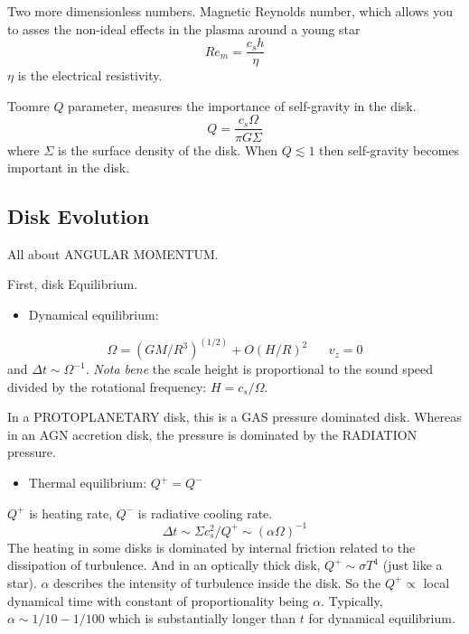 \documentclass[11pt,a4paper]{article}
\begin{document}
Two more dimensionless numbers.  Magnetic Reynolds number, which
allows you to asses the non-ideal effects in the plasma around a
young star 
\begin{equation} 
  Re_{m} = \frac{ c_{s} h} {\eta}
\end{equation} $\eta$ is the electrical resistivity.

Toomre $Q$ parameter, measures the importance of self-gravity in the
disk.
\begin{equation} 
  Q = \frac{ c_{s} \Omega } {\pi G \Sigma}
\end{equation} where $\Sigma$ is the surface density of the disk.
When $Q\lesssim1$ then self-gravity becomes important in the disk.


\subsection{Disk Evolution}
All about ANGULAR MOMENTUM. 

First, disk Equilibrium.  
\begin{itemize}
  \item Dynamical equilibrium: 
\end{itemize}
\begin{equation}
  \Omega = (GM / R^3)^(1/2)  + O(H/R)^{2}          \;\;\;\;\;\; v_{z} = 0
\end{equation}
and $\Delta t \sim \Omega^{-1}$. 
{\it Nota bene} the scale height is proportional to the sound speed divided 
by the rotational frequency: $H = c_{s} / \Omega$. 

In a PROTOPLANETARY disk, this is a GAS pressure dominated disk.
Whereas in an AGN accretion disk, the pressure is dominated by the
RADIATION pressure.

\begin{itemize}
  \item Thermal equilibrium:   $Q^{+}=Q^{-}$
\end{itemize}
 $Q^{+}$ is heating rate,  $Q^{-}$ is radiative cooling rate. 
\begin{equation}
  \Delta t \sim \Sigma c_{s}^{2} / Q^{+} \sim (\alpha \Omega)^{-1}
\end{equation}
The heating in some disks is dominated by internal friction related to
the dissipation of turbulence.  And in an optically thick disk, $Q^{+}
\sim \sigma T^{4}$ (just like a star).  $\alpha$ describes the
intensity of turbulence inside the disk.  So the $Q^{+} \propto$ local
dynamical time with constant of proportionality being $\alpha$.
Typically, $\alpha \sim 1/10 - 1/100$ which is substantially longer
than $t$ for dynamical equilibrium.
\end{document}
